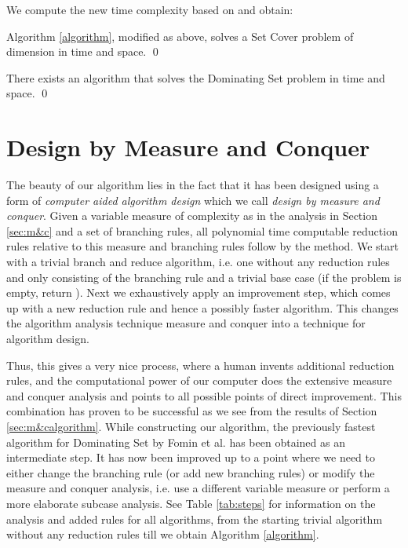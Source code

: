\documentclass[fleqn]{stacs_proc}
\begin{document}
We compute the new time complexity based on \cite{FominGK07,Robson86} and obtain:
\begin{theorem} \label{thrm:exptime}
Algorithm \ref{algorithm}, modified as above, solves a {\sc Set Cover}
problem of dimension  in  time and space.
\qed
\end{theorem}
\begin{corollary}
There exists an algorithm that solves the {\sc Dominating Set} problem in  time and space.
\qed
\end{corollary}




\section{Design by Measure and Conquer}
\label{section:design}
The beauty of our algorithm lies in the fact that it has been designed
using a form of {\em computer aided algorithm design} which we call {\em design by measure and conquer}.
Given a variable measure of complexity as in the analysis in Section \ref{sec:m&c}
and a set of branching rules, all polynomial time computable reduction rules
relative to this measure and branching rules follow by the method.
We start with a trivial branch and reduce algorithm, i.e. one without any reduction rules and only
consisting of the branching rule and a trivial base case (if the problem is empty, return ).
Next we exhaustively apply an improvement step,
which comes up with a new reduction rule and hence a possibly faster algorithm.
This changes the algorithm analysis technique measure and conquer into a technique for algorithm design.

Thus, this gives a very nice process, where a human invents 
additional reduction rules, and the computational power of our computer does
the extensive measure and conquer analysis and
points to all possible points of direct improvement.
This combination has proven to be successful
as we see from the results of Section \ref{sec:m&calgorithm}.
While constructing our algorithm, the previously fastest algorithm for {\sc Dominating Set}
by Fomin et al. \cite{FominGK05a} has been obtained as an intermediate step.
It has now been improved up to a point where we need to either
change the branching rule (or add new branching rules) or modify the measure and conquer analysis,
i.e. use a different variable measure or perform a more elaborate subcase analysis.
See Table \ref{tab:steps} for information on the analysis and added rules for
all algorithms, from the starting trivial algorithm without any reduction
rules till we obtain Algorithm \ref{algorithm}.
\end{document}
